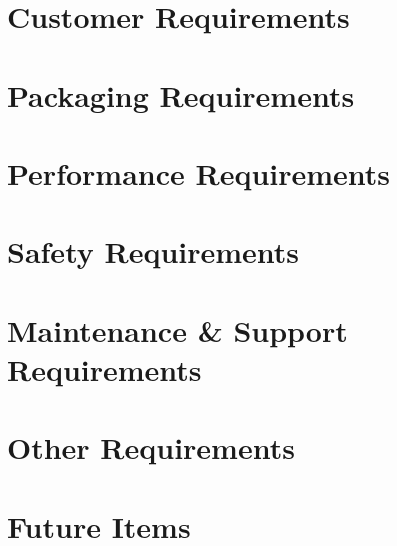 \documentclass[11pt,letterpaper]{article}
\begin{document}
\section{Customer Requirements}

\newpage
\section{Packaging Requirements}

\newpage
\section{Performance Requirements}

\newpage
\section{Safety Requirements}

\newpage
\section{Maintenance \& Support Requirements}

\newpage
\section{Other Requirements}

\newpage
\section{Future Items}

\newpage



{}
\end{document}
